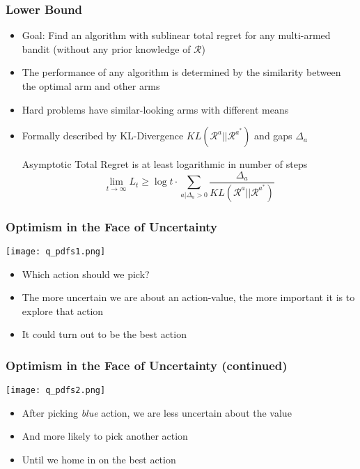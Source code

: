\documentclass[handout]{beamer}
\begin{document}
\begin{frame}
\frametitle{Lower Bound}
\pause
\begin{itemize}[<+->]
\item Goal: Find an algorithm with sublinear total regret for any multi-armed bandit (without any prior knowledge of $\mathcal{R}$)
\item The performance of any algorithm is determined by the similarity between the optimal arm and other arms
\item Hard problems have similar-looking arms with different means
\item Formally described by KL-Divergence $KL(\mathcal{R}^a||\mathcal{R}^{a^*})$ and gaps $\Delta_a$
\begin{theorem}
Asymptotic Total Regret is at least logarithmic in number of steps
$$\lim_{t\rightarrow \infty} L_t \geq \log t \cdot \sum_{a|\Delta_a > 0} \frac {\Delta_a} {KL(\mathcal{R}^a||\mathcal{R}^{a^*})}$$
\end{theorem}
\end{itemize}
\end{frame}

\begin{frame}
\frametitle{Optimism in the Face of Uncertainty}
\pause
\texttt{[image: q\_pdfs1.png]}
\begin{itemize}[<+->]
\item Which action should we pick?
\item The more uncertain we are about an action-value, the more important it is to explore that action
\item It could turn out to be the best action
\end{itemize}
\end{frame}

\begin{frame}
\frametitle{Optimism in the Face of Uncertainty (continued)}
\pause
\texttt{[image: q\_pdfs2.png]}
\begin{itemize}[<+->]
\item After picking {\em blue} action, we are less uncertain about the value
\item And more likely to pick another action
 \item Until we home in on the best action
\end{itemize}
\end{frame}
\end{document}
